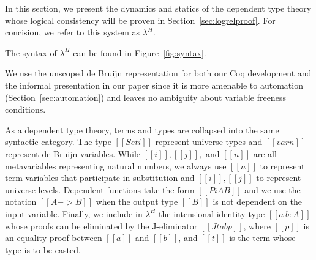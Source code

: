 \documentclass[acmsmall,screen=true,
\ifpublic review=false\else,review=true\fi
  ,anonymous=\ifanonymous true\else false\fi]{acmart}
\newcommand{\lang}{$\lambda^H$\xspace}
\newcommand{\scw}[1]{}
\begin{document}
In this section, we present the dynamics and statics of the
dependent type theory whose logical consistency will be proven in
Section~\ref{sec:logrelproof}. For concision, we refer to this system
as \lang.

The syntax of \lang can be found in Figure~\ref{fig:syntax}.
\scw{Why so many metavariables for terms? Do you need $c$, $p$ and $t$?}
We use
the unscoped de Bruijn representation for both our Coq development and
the informal presentation in our paper since it is more amenable to
automation (Section~\ref{sec:automation}) and leaves no ambiguity
about variable freeness conditions.

 \scw{Give an overview of the figure}
\scw{Define a convention that separates your use of natural numbers. Sometimes they
are universe levels and sometimes they are de Bruijn indices. Better to have separate
metavariables for each. (And it is possible to generalize universe levels to structures other than natural numbers. Ask Jonathan.}
As a dependent type theory, terms and types are collapsed into the same
syntactic category. The type $[[Set i]]$ represent universe
types and $[[var n]]$ represent de Bruijn variables. While
$[[i]],[[j]],$ and $[[n]]$ are all metavariables representing natural
numbers, we always use $[[n]]$ to represent term variables that
participate in substitution and $[[i]],[[j]]$ to represent universe levels.
Dependent functions take the form $[[Pi A B]]$ and
we use the notation $[[A -> B]]$ when the output type $[[B]]$ is not
dependent on the input variable.
Finally, we include in \lang{} the intensional identity type $[[a ~ b : A]]$ whose
proofs can be eliminated by the J-eliminator $[[J t a b p]]$, where
$[[p]]$ is an equality proof between $[[a]]$ and $[[b]]$, and $[[t]]$
is the term whose type is to be casted.
\scw{Example of what you can use identity types for? Or an example of
a program that uses J?}

\end{document}
